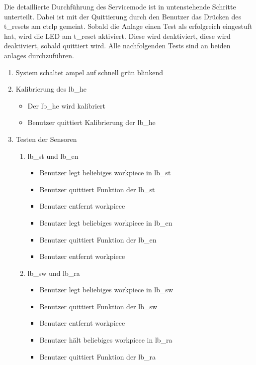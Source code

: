 Die detaillierte Durchführung des Servicemode ist in untenstehende Schritte unterteilt.
Dabei ist mit der Quittierung durch den Benutzer das Drücken des \gls{t_reset}s am \gls{ctrlp} gemeint.
Sobald die Anlage einen Test als erfolgreich eingestuft hat, wird die LED am \gls{t_reset} aktiviert.
Diese wird deaktiviert, diese wird deaktiviert, sobald quittiert wird.
Alle nachfolgenden Tests sind an beiden \glspl{anlage} durchzuführen.
\begin{enumerate}
    \item System schaltet \gls{ampel} auf schnell grün blinkend
    \item Kalibrierung des \gls{lb_he}
    \begin{itemize}
        \item Der \gls{lb_he} wird kalibriert
        \item Benutzer quittiert Kalibrierung der \gls{lb_he}
    \end{itemize}
    \item Testen der Sensoren
    \begin{enumerate}
        \item \Gls{lb_st} und \gls{lb_en}
        \begin{itemize}
            \item Benutzer legt beliebiges \gls{workpiece} in \gls{lb_st}
            \item Benutzer quittiert Funktion der \gls{lb_st}
            \item Benutzer entfernt \gls{workpiece}
            \item Benutzer legt beliebiges \gls{workpiece} in \gls{lb_en}
            \item Benutzer quittiert Funktion der \gls{lb_en}
            \item Benutzer entfernt \gls{workpiece}
        \end{itemize}
        \item \Gls{lb_sw} und \gls{lb_ra}
        \begin{itemize}
            \item Benutzer legt beliebiges \gls{workpiece} in \gls{lb_sw}
            \item Benutzer quittiert Funktion der \gls{lb_sw}
            \item Benutzer entfernt \gls{workpiece}
            \item Benutzer hält beliebiges \gls{workpiece} in \gls{lb_ra}
            \item Benutzer quittiert Funktion der \gls{lb_ra}

\end{itemize}
\end{enumerate}
\end{enumerate}
